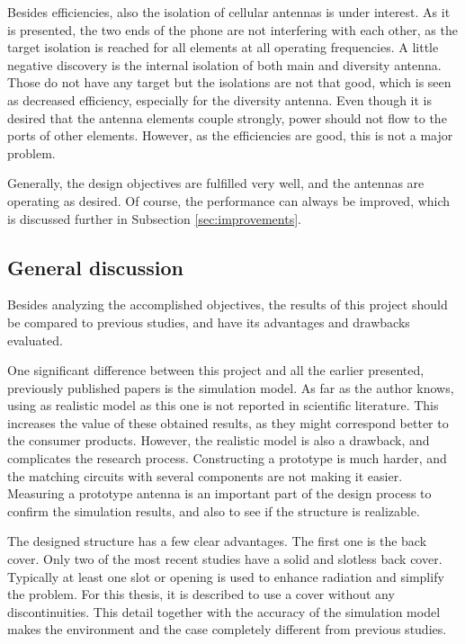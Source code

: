 Besides efficiencies, also the isolation of cellular antennas is under interest. As it is presented, the two ends of the phone are not interfering with each other, as the target isolation is reached for all elements at all operating frequencies. A little negative discovery is the internal isolation of both main and diversity antenna. Those do not have any target but the isolations are not that good, which is seen as decreased efficiency, especially for the diversity antenna. Even though it is desired that the antenna elements couple strongly, power should not flow to the ports of other elements. However, as the efficiencies are good, this is not a major problem.

Generally, the design objectives are fulfilled very well, and the antennas are operating as desired. Of course, the performance can always be improved, which is discussed further in Subsection \ref{sec:improvements}.


\subsection{General discussion}
\label{sec:general_discussion}
Besides analyzing the accomplished objectives, the results of this project should be compared to previous studies, and have its advantages and drawbacks evaluated.

One significant difference between this project and all the earlier presented, previously published papers is the simulation model. As far as the author knows, using as realistic model as this one is not reported in scientific literature. This increases the value of these obtained results, as they might correspond better to the consumer products. However, the realistic model is also a drawback, and complicates the research process. Constructing a prototype is much harder, and the matching circuits with several components are not making it easier. Measuring a prototype antenna is an important part of the design process to confirm the simulation results, and also to see if the structure is realizable.

The designed structure has a few clear advantages. The first one is the back cover. Only two of the most recent studies have a solid and slotless back cover. Typically at least one slot or opening is used to enhance radiation and simplify the problem. For this thesis, it is described to use a cover without any discontinuities. This detail together with the accuracy of the simulation model makes the environment and the case completely different from previous studies.

